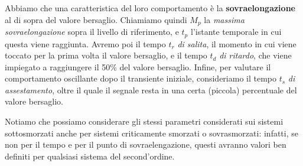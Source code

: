 \documentclass[a4paper,11pt]{article}
\begin{document}
\par\bigskip

Abbiamo che una caratteristica del loro comportamento è la \textbf{sovraelongazione} al di sopra del valore bersaglio.
Chiamiamo quindi $M_p$ la \textit{massima sovraelongazione} sopra il livello di riferimento, e $t_p$ l'istante temporale in cui questa viene raggiunta.
Avremo poi il tempo $t_r$ \textit{di salita}, il momento in cui viene toccato per la prima volta il valore bersaglio, e il tempo $t_d$ \textit{di ritardo}, che viene impiegato a raggiungere il 50\% del valore bersaglio.
Infine, per valutare il comportamento oscillante dopo il transiente iniziale, consideriamo il tempo $t_s$ \textit{di assestamento}, oltre il quale il segnale resta in una certa (piccola) percentuale del valore bersaglio.

Notiamo che possiamo considerare gli stessi parametri considerati sui sistemi sottosmorzati anche per sistemi criticamente smorzati o sovrasmorzati: infatti, se non per il tempo e per il punto di sovraelengazione, questi avranno valori ben definiti per qualsiasi sistema del second'ordine.
\end{document}
